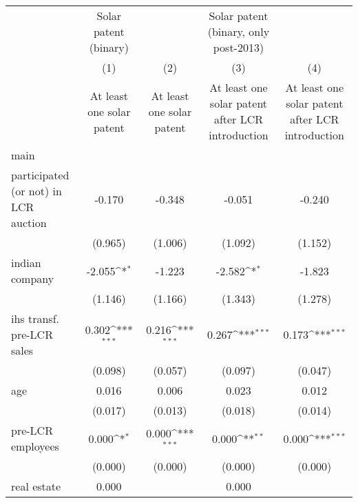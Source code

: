 {
\def\sym#1{\ifmmode^{#1}\else\(^{#1}\)\fi}
\begin{tabular}{l*{4}{c}}
\hline\hline
                    &Solar patent (binary)         &                     &Solar patent (binary, only post-2013)         &                     \\
                    &\multicolumn{1}{c}{(1)}&\multicolumn{1}{c}{(2)}&\multicolumn{1}{c}{(3)}&\multicolumn{1}{c}{(4)}\\
                    &\multicolumn{1}{c}{At least one solar patent}&\multicolumn{1}{c}{At least one solar patent}&\multicolumn{1}{c}{At least one solar patent after LCR introduction}&\multicolumn{1}{c}{At least one solar patent after LCR introduction}\\
\hline
main                &                     &                     &                     &                     \\
participated (or not) in LCR auction&      -0.170         &      -0.348         &      -0.051         &      -0.240         \\
                    &     (0.965)         &     (1.006)         &     (1.092)         &     (1.152)         \\
[1em]
indian company      &      -2.055\sym{*}  &      -1.223         &      -2.582\sym{*}  &      -1.823         \\
                    &     (1.146)         &     (1.166)         &     (1.343)         &     (1.278)         \\
[1em]
ihs transf. pre-LCR sales&       0.302\sym{***}&       0.216\sym{***}&       0.267\sym{***}&       0.173\sym{***}\\
                    &     (0.098)         &     (0.057)         &     (0.097)         &     (0.047)         \\
[1em]
age                 &       0.016         &       0.006         &       0.023         &       0.012         \\
                    &     (0.017)         &     (0.013)         &     (0.018)         &     (0.014)         \\
[1em]
pre-LCR employees   &       0.000\sym{*}  &       0.000\sym{***}&       0.000\sym{**} &       0.000\sym{***}\\
                    &     (0.000)         &     (0.000)         &     (0.000)         &     (0.000)         \\
[1em]
real estate         &       0.000         &                     &       0.000         &                     \\

\end{tabular}}
